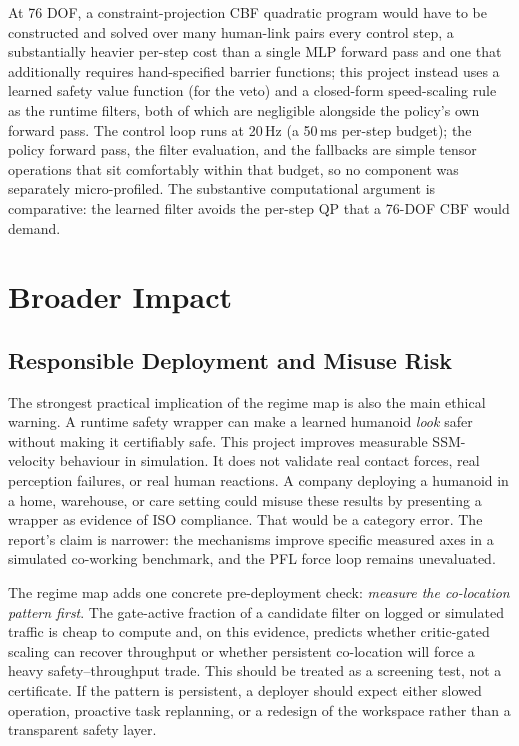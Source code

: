 \documentclass[11pt,a4paper]{report}
\newcommand{\ssm}{SSM}
\newcommand{\pfl}{PFL}
\begin{document}
At 76 DOF, a constraint-projection CBF quadratic program would have to
be constructed and solved over many human-link pairs every control
step, a substantially heavier per-step cost than a single MLP forward
pass and one that additionally requires hand-specified barrier
functions; this project instead uses a learned safety value function
(for the veto) and a closed-form speed-scaling rule as the runtime
filters, both of which are negligible alongside the policy's own
forward pass. The control loop runs at 20\,Hz (a 50\,ms per-step
budget); the policy forward pass, the filter evaluation, and the
fallbacks are simple tensor operations that sit comfortably within
that budget, so no component was separately micro-profiled. The
substantive computational argument is comparative: the learned
filter avoids the per-step QP that a 76-DOF CBF would demand.

\section{Broader Impact}
\label{sec:disc:broader}

\subsection{Responsible Deployment and Misuse Risk}

The strongest practical implication of the regime map is also the main
ethical warning. A runtime safety wrapper can make a learned humanoid
\emph{look} safer without making it certifiably safe. This project
improves measurable \ssm{}-velocity behaviour in simulation. It does
not validate real contact forces, real perception failures, or real
human reactions. A company deploying a humanoid in a home, warehouse,
or care setting could misuse these results by presenting a wrapper as
evidence of ISO compliance. That would be a category error. The
report's claim is narrower: the mechanisms improve specific measured
axes in a simulated co-working benchmark, and the \pfl{} force loop
remains unevaluated.

The regime map adds one concrete pre-deployment check: \emph{measure
the co-location pattern first}. The gate-active fraction of a candidate
filter on logged or simulated traffic is cheap to compute and, on this
evidence, predicts whether critic-gated scaling can recover throughput
or whether persistent co-location will force a heavy safety--throughput
trade. This should be treated as a screening test, not a certificate.
If the pattern is persistent, a deployer should expect either slowed
operation, proactive task replanning, or a redesign of the workspace
rather than a transparent safety layer.
\end{document}
